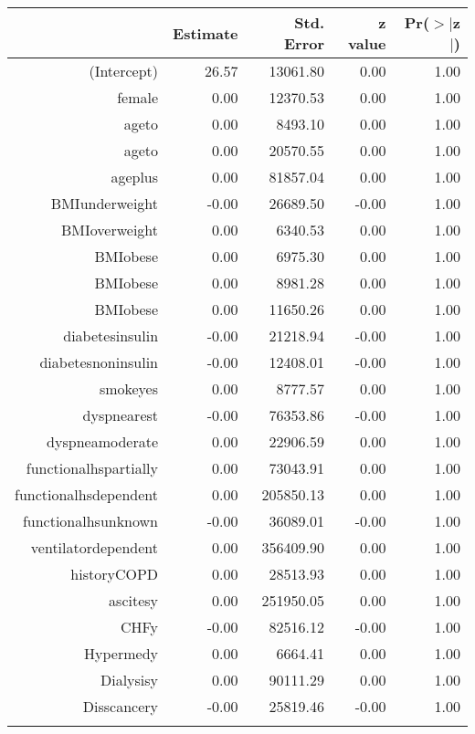 \bigskip\bigskip
\centering
\begin{tabular}{rrrrr}
  \hline
 & Estimate & Std. Error & z value & Pr($>$$|$z$|$) \\ 
  \hline
(Intercept) & 26.57 & 13061.80 & 0.00 & 1.00 \\ 
  female & 0.00 & 12370.53 & 0.00 & 1.00 \\ 
  age\-65\-to\-74 & 0.00 & 8493.10 & 0.00 & 1.00 \\ 
  age\-75\-to\-84 & 0.00 & 20570.55 & 0.00 & 1.00 \\ 
  age\-85\-plus & 0.00 & 81857.04 & 0.00 & 1.00 \\ 
  BMI\-underweight & -0.00 & 26689.50 & -0.00 & 1.00 \\ 
  BMI\-overweight & 0.00 & 6340.53 & 0.00 & 1.00 \\ 
  BMI\-obese\-1 & 0.00 & 6975.30 & 0.00 & 1.00 \\ 
  BMI\-obese\-2 & 0.00 & 8981.28 & 0.00 & 1.00 \\ 
  BMI\-obese\-3 & 0.00 & 11650.26 & 0.00 & 1.00 \\ 
  diabetes\-insulin & -0.00 & 21218.94 & -0.00 & 1.00 \\ 
  diabetes\-noninsulin & -0.00 & 12408.01 & -0.00 & 1.00 \\ 
  smoke\-yes & 0.00 & 8777.57 & 0.00 & 1.00 \\ 
  dyspnea\-rest & -0.00 & 76353.86 & -0.00 & 1.00 \\ 
  dyspnea\-moderate & 0.00 & 22906.59 & 0.00 & 1.00 \\ 
  functional\-hs\-partially & 0.00 & 73043.91 & 0.00 & 1.00 \\ 
  functional\-hs\-dependent & 0.00 & 205850.13 & 0.00 & 1.00 \\ 
  functional\-hs\-unknown & -0.00 & 36089.01 & -0.00 & 1.00 \\ 
  ventilator\-dependent & 0.00 & 356409.90 & 0.00 & 1.00 \\ 
  history\-COPD & 0.00 & 28513.93 & 0.00 & 1.00 \\ 
  ascites\-y & 0.00 & 251950.05 & 0.00 & 1.00 \\ 
  CHF\-y & -0.00 & 82516.12 & -0.00 & 1.00 \\ 
  Hyper\-med\-y & 0.00 & 6664.41 & 0.00 & 1.00 \\ 
  Dialysis\-y & 0.00 & 90111.29 & 0.00 & 1.00 \\ 
  Diss\-cancer\-y & -0.00 & 25819.46 & -0.00 & 1.00 \\ 
$$
\end{tabular}
